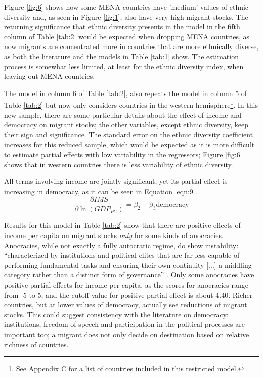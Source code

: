 \documentclass[../main.tex]{subfiles}
\begin{document}
Figure \ref{fig:6} shows how some MENA countries have 'medium' values of ethnic diversity and, as seen in Figure \ref{fig:1}, also have very high migrant stocks. The returning significance that ethnic diversity presents in the model in the fifth column of Table \ref{tab:2} would be expected when dropping MENA countries, as now migrants are concentrated more in countries that are more ethnically diverse, as both the literature and the models in Table \ref{tab:1} show. The estimation process is somewhat less limited, at least for the ethnic diversity index, when leaving out MENA countries.

The model in column 6 of Table \ref{tab:2}, also repeats the model in column 5 of Table \ref{tab:2} but now only considers countries in the western hemisphere\footnote{See Appendix \hyperref[sec:C]{C} for a list of countries included in this restricted model.}. In this new sample, there are some particular details about the effect of income and democracy on migrant stocks; the other variables, except ethnic diversity, keep their sign and significance. The standard error on the ethnic diversity coefficient increases for this reduced sample, which would be expected as it is more difficult to estimate partial effects with low variability in the regressors; Figure \ref{fig:6} shows that in western countries there is less variability of ethnic diversity. 

All terms involving income are jointly significant, yet its partial effect is increasing in democracy, as it can be seen in Equation \ref{eqn:9}. 
\begin{equation}
    \frac{\partial IMS}{\partial \ln({GDP_{PC}})}= \beta_2 + \beta_3 \text{democracy}
    \label{eqn:9}
\end{equation}

Results for this model in Table \ref{tab:2} show that there are positive effects of income per capita on migrant stocks \textit{only} for some kinds of anocracies. Anocracies, while not exactly a fully autocratic regime, do show instability: \enquote{characterized by institutions and political elites that are far less capable of performing fundamental tasks and ensuring their own continuity [...] a middling category rather than a distinct form of governance} \parencite[p.30]{Marshall.2017}. Only some anocracies have positive partial effects for income per capita, as the scores for anocracies range from -5 to 5, and the cutoff value for positive partial effect is about 4.40. Richer countries, but at lower values of democracy, actually see reductions of migrant stocks. This could suggest consistency with the literature on democracy: institutions, freedom of speech and participation in the political processes are important too; a migrant does not only decide on destination based on relative richness of countries. 
\end{document}

